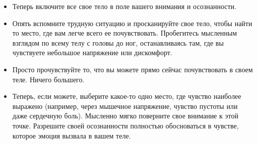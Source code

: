 \vspace{2ex}

\begin{itemize}
	\item Теперь включите все свое тело в поле вашего внимания и осознанности.
	
	\item Опять вспомните трудную ситуацию и просканируйте свое тело, чтобы найти то место, где вам легче всего ее почувствовать. Пробегитесь мысленным взглядом по всему телу с головы до ног, останавливаясь там, где вы чувствуете небольшое напряжение или дискомфорт.
	
	\item Просто прочувствуйте то, что вы можете прямо сейчас почувствовать в своем теле. Ничего большего.
	
	\item Теперь, если можете, выберите какое-то одно место, где чувство наиболее выражено (например, через мышечное напряжение, чувство пустоты или даже сердечную боль).
	Мысленно мягко  поверните свое внимание к этой точке. Разрешите своей осознанности полностью обосноваться в чувстве, которое эмоция вызвала в вашем теле.	
\end{itemize}

\vspace{2ex}

